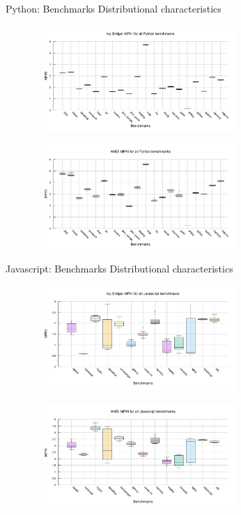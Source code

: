 \documentclass[10pt]{beamer}
\begin{document}
\begin{frame}{Python: Benchmarks Distributional characteristics}
	\begin{minipage}{\textwidth}
		\begin{figure}
        \includegraphics[width=8cm, height=4cm]{figures/python_box_ivy_bridge.pdf}
		\end{figure}
	\end{minipage}
		\begin{minipage}{\textwidth}
			\begin{figure}
				\includegraphics[width=8cm, height=4cm]{figures/python_box_amd.pdf}
			\end{figure}
		\end{minipage}
\end{frame}

\begin{frame}{Javascript: Benchmarks Distributional characteristics}
	\begin{minipage}{\textwidth}
		\begin{figure}
        \includegraphics[width=8cm, height=4cm]{figures/javascript_box_ivy_bridge.pdf}
		\end{figure}
	\end{minipage}
		\begin{minipage}{\textwidth}
			\begin{figure}
				\includegraphics[width=8cm, height=4cm]{figures/javascript_box_amd.pdf}
			\end{figure}
		\end{minipage}
\end{frame}
\end{document}
